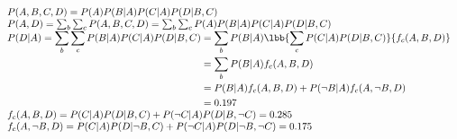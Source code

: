 $\begin{array}{l}
    P(A,B,C,D)=P(A)P(B|A)P(C|A)P(D|B,C)\\
    P(A,D)=\sum_b\sum_c P(A,B,C,D)=\sum_b\sum_c P(A)P(B|A)P(C|A)P(D|B,C)\\
    \begin{aligned}
        P(D|A)=\sum_b\sum_cP(B|A)P(C|A)P(D|B,C)&=\sum_b P(B|A)\lbb{\sum_c P(C|A)P(D|B,C)}{f_c(A,B,D)}\\
        &= \sum_bP(B|A)f_c(A,B,D) \\
        &= P(B|A)f_c(A,B,D)+P(\neg B|A)f_c(A,\neg B,D) \\
        &= 0.197 \\
    \end{aligned}\\
    f_c(A,B,D)=P(C|A)P(D|B,C)+P(\neg C|A)P(D|B,\neg C)=0.285\\
    f_c(A,\neg B,D)=P(C|A)P(D|\neg B,C)+P(\neg C|A)P(D|\neg B,\neg C)=0.175\\
\end{array}$

